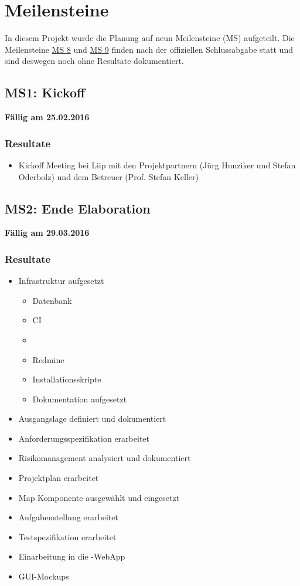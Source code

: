\section{Meilensteine}
\label{pm-meilensteine}

In diesem Projekt wurde die Planung auf neun Meilensteine (MS) aufgeteilt. 
Die Meilensteine \hyperref[pm-ms8]{MS 8} und \hyperref[pm-ms9]{MS 9} finden nach der offiziellen Schlussabgabe statt und sind deswegen noch ohne Resultate dokumentiert.

\subsection{MS1: Kickoff}
\label{pm-ms1}
\textbf{Fällig am 25.02.2016}
\subsubsection{Resultate}
\begin{itemize}
	\item Kickoff Meeting bei Liip mit den Projektpartnern (Jürg Hunziker und Stefan Oderbolz) und dem Betreuer (Prof. Stefan Keller)
\end{itemize}

\subsection{MS2: Ende Elaboration}
\label{pm-ms2}
\textbf{Fällig am 29.03.2016}
\subsubsection{Resultate}
\begin{itemize}
	\item Infrastruktur aufgesetzt
	\begin{itemize}
		\item Datenbank
		\item \gls{CI}
		\item {}
		\item Redmine
		\item Installationsskripte
		\item Dokumentation aufgesetzt
	\end{itemize}
	\item Ausgangslage definiert und dokumentiert
	\item Anforderungsspezifikation erarbeitet
	\item Risikomanagement analysiert und dokumentiert
	\item Projektplan erarbeitet
	\item Map Komponente ausgewählt und eingesetzt
	\item Aufgabenstellung erarbeitet
	\item Testspezifikation erarbeitet
	\item Einarbeitung in die \kort{}-\gls{WebApp}
	\item \gls{GUI}-Mockups
\end{itemize}

